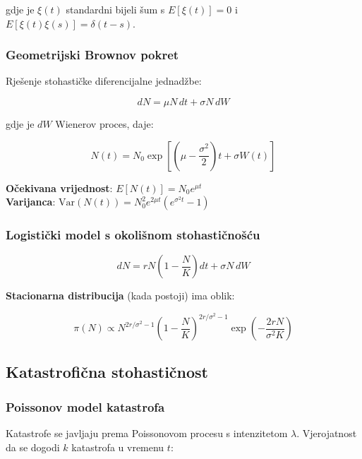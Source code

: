 \documentclass[11pt,oneside]{book}
\begin{document}
gdje je $\xi(t)$ standardni bijeli šum s $E[\xi(t)] = 0$ i $E[\xi(t)\xi(s)] = \delta(t-s)$.

\subsubsection{Geometrijski Brownov pokret}

Rješenje stohastičke diferencijalne jednadžbe:

\begin{equation}
	dN = \mu N \, dt + \sigma N \, dW
\end{equation}

gdje je $dW$ Wienerov proces, daje:

\begin{equation}
	N(t) = N_0 \exp\left[\left(\mu - \frac{\sigma^2}{2}\right)t + \sigma W(t)\right]
\end{equation}

\textbf{Očekivana vrijednost}: $E[N(t)] = N_0 e^{\mu t}$\\
\textbf{Varijanca}: $\text{Var}(N(t)) = N_0^2 e^{2\mu t}(e^{\sigma^2 t} - 1)$

\subsubsection{Logistički model s okolišnom stohastičnošću}

\begin{equation}
	dN = rN\left(1 - \frac{N}{K}\right)dt + \sigma N \, dW
\end{equation}

\textbf{Stacionarna distribucija} (kada postoji) ima oblik:

\begin{equation}
	\pi(N) \propto N^{2r/\sigma^2 - 1} \left(1 - \frac{N}{K}\right)^{2r/\sigma^2 - 1} \exp\left(-\frac{2rN}{\sigma^2 K}\right)
\end{equation}

\subsection{Katastrofična stohastičnost}

\subsubsection{Poissonov model katastrofa}

Katastrofe se javljaju prema Poissonovom procesu s intenzitetom $\lambda$. Vjerojatnost da se dogodi $k$ katastrofa u vremenu $t$:
\end{document}
